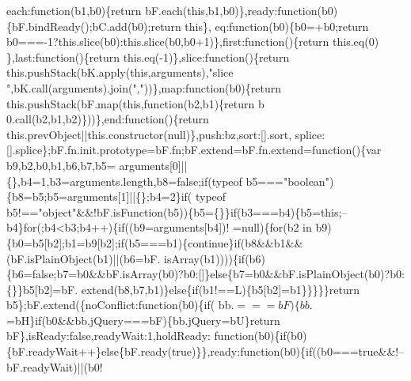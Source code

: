 \begin{DoxyCode}
      each:\textcolor{keyword}{function}(b1,b0)\{\textcolor{keywordflow}{return} bF.each(\textcolor{keyword}{this},b1,b0)\},ready:\textcolor{keyword}{function}(b0)\{bF.bindReady();bC.add(b0);\textcolor{keywordflow}{return} \textcolor{keyword}{this}\},
      eq:\textcolor{keyword}{function}(b0)\{b0=+b0;\textcolor{keywordflow}{return} b0===-1?this.slice(b0):this.slice(b0,b0+1)\},first:function()\{\textcolor{keywordflow}{return} this.eq(0)
      \},last:\textcolor{keyword}{function}()\{\textcolor{keywordflow}{return} this.eq(-1)\},slice:\textcolor{keyword}{function}()\{\textcolor{keywordflow}{return} this.pushStack(bK.apply(\textcolor{keyword}{this},arguments),\textcolor{stringliteral}{"slice
      "},bK.call(arguments).join(\textcolor{stringliteral}{","}))\},map:\textcolor{keyword}{function}(b0)\{\textcolor{keywordflow}{return} this.pushStack(bF.map(\textcolor{keyword}{this},\textcolor{keyword}{function}(b2,b1)\{return b
      0.call(b2,b1,b2)\}))\},end:\textcolor{keyword}{function}()\{\textcolor{keywordflow}{return} this.prevObject||this.constructor(null)\},push:bz,sort:[].sort,
      splice:[].splice\};bF.fn.init.prototype=bF.fn;bF.extend=bF.fn.extend=\textcolor{keyword}{function}()\{var b9,b2,b0,b1,b6,b7,b5=
      arguments[0]||\{\},b4=1,b3=arguments.length,b8=\textcolor{keyword}{false};\textcolor{keywordflow}{if}(typeof b5===\textcolor{stringliteral}{"boolean"})\{b8=b5;b5=arguments[1]||\{\};b4=2\}\textcolor{keywordflow}{if}(
      typeof b5!==\textcolor{stringliteral}{"object"}&&!bF.isFunction(b5))\{b5=\{\}\}\textcolor{keywordflow}{if}(b3===b4)\{b5=\textcolor{keyword}{this};--b4\}\textcolor{keywordflow}{for}(;b4<b3;b4++)\{\textcolor{keywordflow}{if}((b9=arguments[b4])!
      =null)\{\textcolor{keywordflow}{for}(b2 in b9)\{b0=b5[b2];b1=b9[b2];\textcolor{keywordflow}{if}(b5===b1)\{\textcolor{keywordflow}{continue}\}\textcolor{keywordflow}{if}(b8&&b1&&(bF.isPlainObject(b1)||(b6=bF.
      isArray(b1))))\{\textcolor{keywordflow}{if}(b6)\{b6=\textcolor{keyword}{false};b7=b0&&bF.isArray(b0)?b0:[]\}\textcolor{keywordflow}{else}\{b7=b0&&bF.isPlainObject(b0)?b0:\{\}\}b5[b2]=bF.
      extend(b8,b7,b1)\}\textcolor{keywordflow}{else}\{\textcolor{keywordflow}{if}(b1!==L)\{b5[b2]=b1\}\}\}\}\}\textcolor{keywordflow}{return} b5\};bF.extend(\{noConflict:\textcolor{keyword}{function}(b0)\{\textcolor{keywordflow}{if}(
      bb.$===bF)\{bb.$=bH\}\textcolor{keywordflow}{if}(b0&&bb.jQuery===bF)\{bb.jQuery=bU\}\textcolor{keywordflow}{return} bF\},isReady:\textcolor{keyword}{false},readyWait:1,holdReady:\textcolor{keyword}{
      function}(b0)\{\textcolor{keywordflow}{if}(b0)\{bF.readyWait++\}\textcolor{keywordflow}{else}\{bF.ready(\textcolor{keyword}{true})\}\},ready:\textcolor{keyword}{function}(b0)\{\textcolor{keywordflow}{if}((b0===\textcolor{keyword}{true}&&!--bF.readyWait)||(b0!

\end{DoxyCode}
